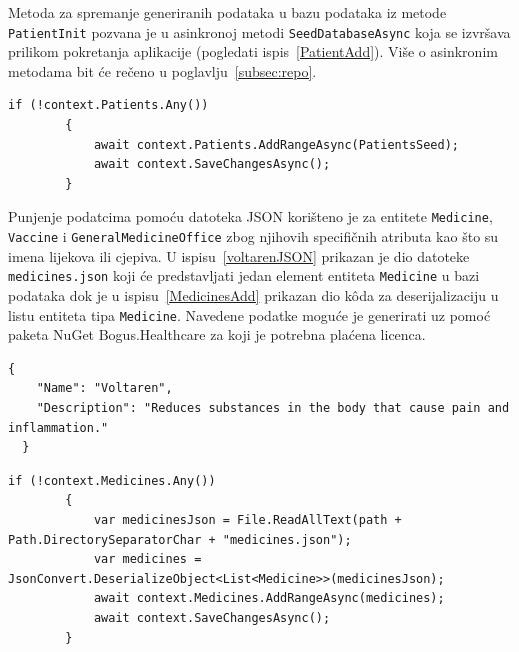 Metoda za spremanje generiranih podataka u bazu podataka iz metode \\\texttt{PatientInit} pozvana je u asinkronoj metodi \texttt{SeedDatabaseAsync} koja se izvršava prilikom pokretanja aplikacije (pogledati ispis~\ref{PatientAdd}). Više o asinkronim metodama bit će rečeno u poglavlju~\ref{subsec:repo}.

\begin{lstlisting}[caption={Metoda \texttt{AddRangeAsync} za spremanje generiranih podataka}, label=PatientAdd]
if (!context.Patients.Any())
        {
            await context.Patients.AddRangeAsync(PatientsSeed);
            await context.SaveChangesAsync();
        }
\end{lstlisting}

Punjenje podatcima pomoću datoteka JSON korišteno je za entitete \texttt{Medicine},\\\texttt{Vaccine} i \texttt{GeneralMedicineOffice} zbog njihovih specifičnih atributa kao što su imena lijekova ili cjepiva. U ispisu~\ref{voltarenJSON} prikazan je dio datoteke \texttt{medicines.json} koji će predstavljati jedan element entiteta \texttt{Medicine} u bazi podataka dok je u ispisu~\ref{MedicinesAdd} prikazan dio k\^oda za deserijalizaciju u listu entiteta tipa \texttt{Medicine}. Navedene podatke moguće je generirati uz pomoć paketa NuGet Bogus.Healthcare za koji je potrebna plaćena licenca.

\begin{lstlisting}[caption={Dio datoteke \texttt{medicines.json} koji će predstavljati jedan element entiteta \texttt{Medicine} u bazi podataka}, label=voltarenJSON]
  {
    "Name": "Voltaren",
    "Description": "Reduces substances in the body that cause pain and inflammation."
  }
\end{lstlisting}

\begin{lstlisting}[caption={Punjenje tablice \texttt{Medicine} podatcima iz JSON datoteke}, label=MedicinesAdd]
        if (!context.Medicines.Any())
        {
            var medicinesJson = File.ReadAllText(path + Path.DirectorySeparatorChar + "medicines.json");
            var medicines = JsonConvert.DeserializeObject<List<Medicine>>(medicinesJson);
            await context.Medicines.AddRangeAsync(medicines);
            await context.SaveChangesAsync();
        }
\end{lstlisting}

